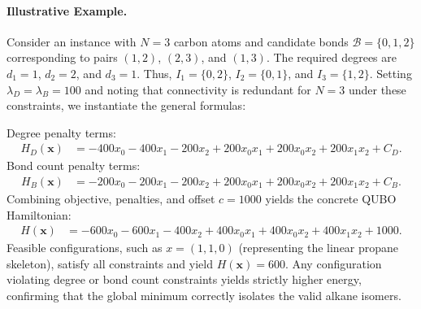 \documentclass[12pt]{article}
\begin{document}
\paragraph{Illustrative Example.}
Consider an instance with $N=3$ carbon atoms and candidate bonds $\mathcal{B} = \{0, 1, 2\}$ corresponding to pairs $(1,2)$, $(2,3)$, and $(1,3)$. The required degrees are $d_1=1$, $d_2=2$, and $d_3=1$. Thus, $I_1=\{0,2\}$, $I_2=\{0,1\}$, and $I_3=\{1,2\}$. Setting $\lambda_D = \lambda_B = 100$ and noting that connectivity is redundant for $N=3$ under these constraints, we instantiate the general formulas:

Degree penalty terms:
\begin{align}
H_D(\mathbf{x}) &= -400x_0 - 400x_1 - 200x_2 + 200x_0x_1 + 200x_0x_2 + 200x_1x_2 + C_D.
\end{align}
Bond count penalty terms:
\begin{align}
H_B(\mathbf{x}) &= -200x_0 - 200x_1 - 200x_2 + 200x_0x_1 + 200x_0x_2 + 200x_1x_2 + C_B.
\end{align}
Combining objective, penalties, and offset $c=1000$ yields the concrete QUBO Hamiltonian:
\begin{align}
H(\mathbf{x}) &= -600x_0 - 600x_1 - 400x_2 + 400x_0x_1 + 400x_0x_2 + 400x_1x_2 + 1000.
\end{align}
Feasible configurations, such as $x = (1, 1, 0)$ (representing the linear propane skeleton), satisfy all constraints and yield $H(\mathbf{x}) = 600$. Any configuration violating degree or bond count constraints yields strictly higher energy, confirming that the global minimum correctly isolates the valid alkane isomers.
\end{document}
